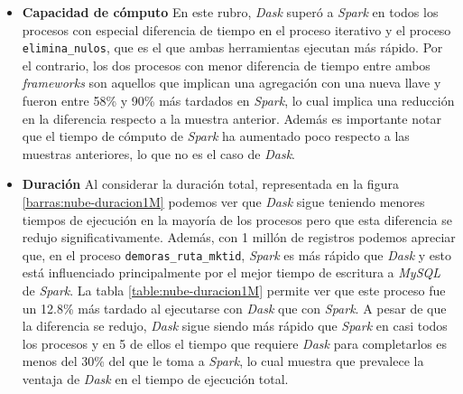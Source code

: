 \begin{itemize}
	\item \textbf{Capacidad de cómputo} En este rubro, \textit{Dask} superó a \textit{Spark} en todos los procesos con especial diferencia de tiempo en el proceso iterativo y el proceso \texttt{elimina\_nulos}, que es el que ambas herramientas ejecutan más rápido. Por el contrario, los dos procesos con menor diferencia de tiempo entre ambos \textit{frameworks} son aquellos que implican una agregación con una nueva llave y fueron entre 58\% y 90\% más tardados en \textit{Spark}, lo cual implica una reducción en la diferencia respecto a la muestra anterior. Además es importante notar que el tiempo de cómputo de \textit{Spark} ha aumentado poco respecto a las muestras anteriores, lo que no es el caso de \textit{Dask}.
	
	\item \textbf{Duración} Al considerar la duración total, representada en la figura \ref{barras:nube-duracion1M} podemos ver que \textit{Dask} sigue teniendo menores tiempos de ejecución en la mayoría de los procesos pero que esta diferencia se redujo significativamente. Además, con 1 millón de registros podemos apreciar que, en el proceso \texttt{demoras\_ruta\_mktid}, \textit{Spark} es más rápido que \textit{Dask} y esto está influenciado principalmente por el mejor tiempo de escritura a \textit{MySQL} de \textit{Spark}. La tabla \ref{table:nube-duracion1M} permite ver que este proceso fue un 12.8\% más tardado al ejecutarse con \textit{Dask} que con \textit{Spark}. A pesar de que la diferencia se redujo, \textit{Dask} sigue siendo más rápido que \textit{Spark} en casi todos los procesos y en 5 de ellos el tiempo que requiere \textit{Dask} para completarlos es menos del 30\% del que le toma a \textit{Spark}, lo cual muestra que prevalece la ventaja de \textit{Dask} en el tiempo de ejecución total.
\end{itemize}

